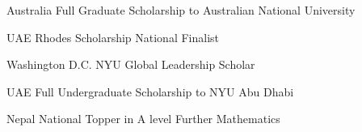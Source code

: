 {%
	Australia}
{%
	Full Graduate Scholarship to Australian National University}
{}

{%
	UAE}
{%
	Rhodes Scholarship National Finalist}
{}

{%
	Washington D.C.}
{%
	NYU Global Leadership Scholar}
{}

{%
	UAE}
{%
	Full Undergraduate Scholarship to NYU Abu Dhabi}
{}

{%
	Nepal}
{%
	National Topper in A level Further Mathematics}
{}
